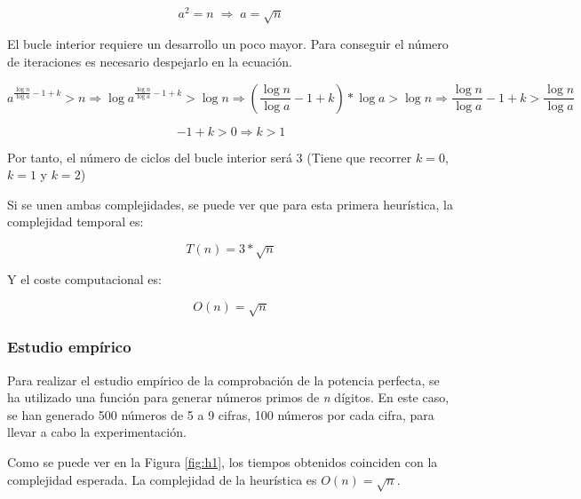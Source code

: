\documentclass{uc3mpracticas}
\begin{document}
  $$ a^2 = n \; \Rightarrow \; a = \sqrt{n} $$

  El bucle interior requiere un desarrollo un poco mayor. Para conseguir el número de iteraciones es necesario despejarlo en la ecuación.

  \vspace{2mm}

  $$ a^{\frac{\log n}{\log a} - 1 + k} > n \Rightarrow \log a^{\frac{\log n}{\log a} - 1 + k} > \log n \Rightarrow (\frac{\log n}{\log a} - 1 + k) * \log a > \log n \Rightarrow  \frac{\log n}{\log a} - 1 + k > \frac{\log n}{\log a}$$

  $$ -1 + k > 0 \Rightarrow k > 1 $$

  Por tanto, el número de ciclos del bucle interior será 3 (Tiene que recorrer $k=0$, $k=1$ y $k=2$)

  \vspace{2mm}

  Si se unen ambas complejidades, se puede ver que para esta primera heurística, la complejidad temporal es:

  $$ T(n) = \displaystyle 3*\sqrt{n}$$

  Y el coste computacional es:

  $$ O(n) = \sqrt{n}$$


  \subsubsection{Estudio empírico}\label{empirico}

  Para realizar el estudio empírico de la comprobación de la potencia perfecta, se ha utilizado una función para generar números primos de \textit{n} dígitos. En este caso, se han generado 500 números de 5 a 9 cifras, 100 números por cada cifra, para llevar a cabo la experimentación.

  \vspace{3mm}


  Como se puede ver en la Figura \ref{fig:h1}, los tiempos obtenidos coinciden con la complejidad esperada. La complejidad de la heurística es $ O(n) = \sqrt{n} $.

\end{document}
